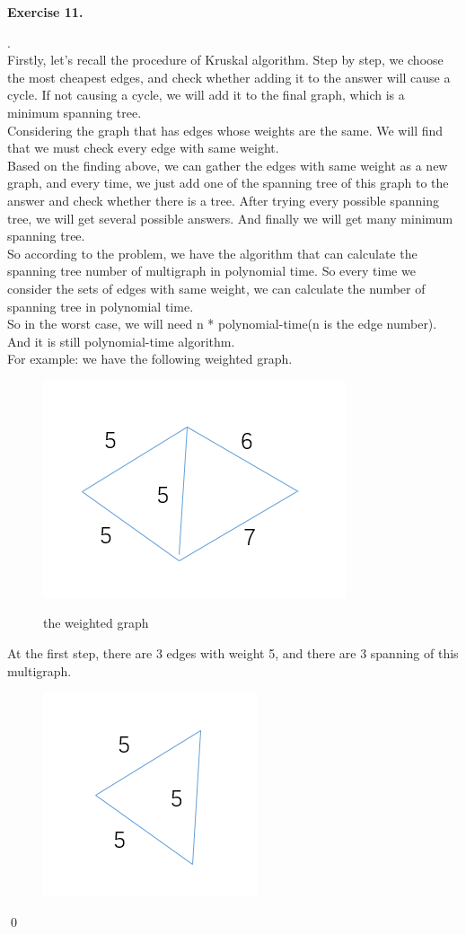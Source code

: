 \documentclass[12pt, notitlepage]{article}
\newenvironment{sol}
  {\par\vspace{3mm}\noindent{\it Solution}.}{\qed}
\begin{document}
\textbf{Exercise 11.}
\begin{sol}\\
Firstly, let's recall the procedure of Kruskal algorithm. Step by step, we choose the most cheapest edges, and check whether adding it to the answer will cause a cycle. If not causing a cycle, we will add it to the final graph, which is a minimum spanning tree.\\
Considering the graph that has edges whose weights are the same. We will find that we must check every edge with same weight.\\
Based on the finding above, we can gather the edges with same weight as a new graph, and every time, we just add one of the spanning tree of this graph to the answer and check whether there is a tree. After trying every possible spanning tree, we will get several possible answers. And finally we will get many minimum spanning tree.\\
So according to the problem, we have the algorithm that can calculate the spanning tree number of multigraph in polynomial time. So every time we consider the sets of edges with same weight, we can calculate the number of spanning tree in polynomial time.\\
So in the worst case, we will need n * polynomial-time(n is the edge number). And it is still polynomial-time algorithm.\\
For example: we have the following weighted graph.\\
\begin{figure}[H]
	\center
	\includegraphics[width=0.4\linewidth]{11-1.png}\vspace{-10pt}
	\caption{the weighted graph} \nonumber\label{fig:the weighted graph}\vspace{-10pt}
\end{figure}
At the first step, there are 3 edges with weight 5, and there are 3 spanning of this multigraph.\\
\begin{figure}[H]
	\center
	\includegraphics[width=0.4\linewidth]{11-2.png}\vspace{-10pt}

\end{figure}
\end{sol}
\end{document}
